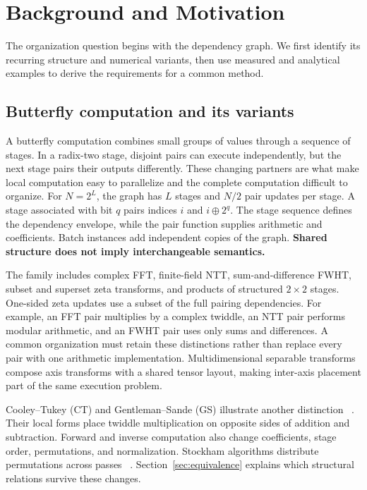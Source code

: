 \section{Background and Motivation}
\label{sec:background}
The organization question begins with the dependency graph. We first identify
its recurring structure and numerical variants, then use measured and analytical
examples to derive the requirements for a common method.

\subsection{Butterfly computation and its variants}
A butterfly computation combines small groups of values through a sequence
of stages. In a radix-two stage, disjoint pairs can execute independently,
but the next stage pairs their outputs differently. These changing partners
are what make local computation easy to parallelize and the complete
computation difficult to organize.
For $N=2^L$, the graph has $L$ stages and $N/2$ pair
updates per stage. A stage associated with bit $q$ pairs indices $i$ and
$i\mathbin{\oplus}2^q$. The stage sequence defines the dependency envelope,
while the pair function supplies arithmetic and coefficients. Batch instances
add independent copies of the graph. \textbf{Shared structure does not imply
interchangeable semantics.}

The family includes complex FFT, finite-field NTT, sum-and-difference FWHT,
subset and superset zeta transforms, and products of structured $2\times2$
stages. One-sided zeta updates use a subset of the full pairing dependencies.
For example, an FFT pair multiplies by a complex twiddle, an NTT pair performs
modular arithmetic, and an FWHT pair uses only sums and differences. A common
organization must retain these distinctions rather than replace every pair
with one arithmetic implementation. Multidimensional separable transforms
compose axis transforms with a shared tensor layout, making inter-axis
placement part of the same execution problem.

Cooley--Tukey (CT) and Gentleman--Sande (GS) illustrate another distinction
~\cite{cooley1965,gentleman1966}. Their local forms place twiddle
multiplication on opposite sides of addition and subtraction. Forward and
inverse computation also change coefficients, stage order, permutations, and
normalization. Stockham algorithms distribute permutations across passes
~\cite{stockham1966}. Section~\ref{sec:equivalence} explains which structural
relations survive these changes.

